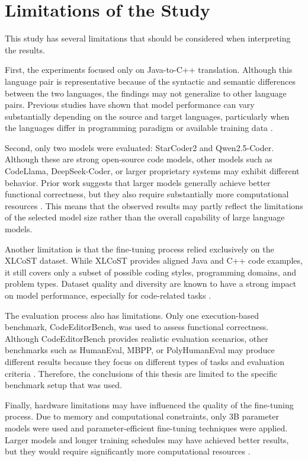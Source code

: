 \section{Limitations of the Study}

This study has several limitations that should be considered when interpreting
the results.

First, the experiments focused only on Java-to-C++ translation. Although this
language pair is representative because of the syntactic and semantic
differences between the two languages, the findings may not generalize to other
language pairs. Previous studies have shown that model performance can vary
substantially depending on the source and target languages, particularly when
the languages differ in programming paradigm or available training data
\cite{llm_limitations}.

Second, only two models were evaluated: StarCoder2 and
Qwen2.5-Coder. Although these are strong open-source code models, other models
such as CodeLlama, DeepSeek-Coder, or larger proprietary systems may exhibit
different behavior. Prior work suggests that larger models generally achieve
better functional correctness, but they also require substantially more
computational resources \cite{llm_survey}. This means that the observed results
may partly reflect the limitations of the selected model size rather than the
overall capability of large language models.

Another limitation is that the fine-tuning process relied exclusively on the
XLCoST dataset. While XLCoST provides aligned Java and C++ code examples, it
still covers only a subset of possible coding styles, programming domains, and
problem types. Dataset quality and diversity are known to have a strong impact
on model performance, especially for code-related tasks \cite{zhu2022xlcost}.

The evaluation process also has limitations. Only one execution-based benchmark,
CodeEditorBench, was used to assess functional correctness. Although
CodeEditorBench provides realistic evaluation scenarios, other benchmarks such
as HumanEval, MBPP, or PolyHumanEval may produce different results because they
focus on different types of tasks and evaluation criteria \cite{chen2021codex,
austin2021mbpp, mhumaneval}. %
Therefore, the conclusions of this thesis are limited to the
specific benchmark setup that was used.

Finally, hardware limitations may have influenced the quality of the
fine-tuning process. Due to memory and computational constraints, only 3B
parameter models were used and parameter-efficient fine-tuning techniques were
applied. Larger models and longer training schedules may have achieved better
results, but they would require significantly more computational resources
\cite{hu2021lora}.